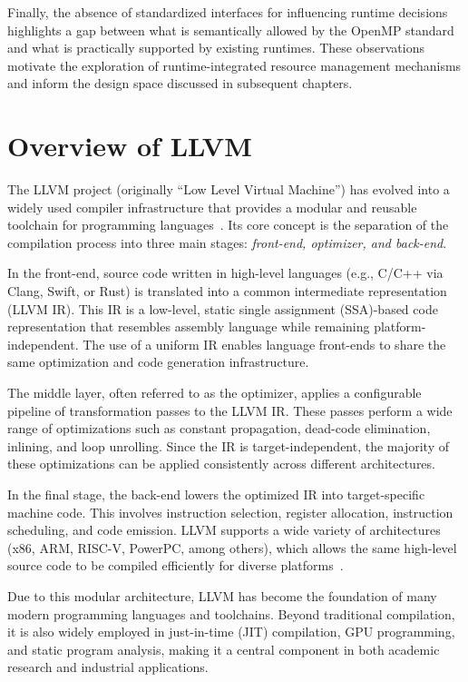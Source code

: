 Finally, the absence of standardized interfaces for influencing runtime decisions highlights a gap between what is semantically allowed by the OpenMP standard and what is practically supported by existing runtimes. These observations motivate the exploration of runtime-integrated resource management mechanisms and inform the design space discussed in subsequent chapters.

\section{Overview of LLVM}

The LLVM project (originally ``Low Level Virtual Machine'') has evolved into a widely used compiler infrastructure that provides a modular and reusable toolchain for programming languages~\parencite{lattner_llvm_2004}. Its core concept is the separation of the compilation process into three main stages: \textit{front-end, optimizer, and back-end}.

In the front-end, source code written in high-level languages (e.g., C/C++ via Clang, Swift, or Rust) is translated into a common intermediate representation (LLVM IR). This IR is a low-level, static single assignment (SSA)-based code representation that resembles assembly language while remaining platform-independent. The use of a uniform IR enables language front-ends to share the same optimization and code generation infrastructure.

The middle layer, often referred to as the optimizer, applies a configurable pipeline of transformation passes to the LLVM IR\@. These passes perform a wide range of optimizations such as constant propagation, dead-code elimination, inlining, and loop unrolling. Since the IR is target-independent, the majority of these optimizations can be applied consistently across different architectures.

In the final stage, the back-end lowers the optimized IR into target-specific machine code. This involves instruction selection, register allocation, instruction scheduling, and code emission. LLVM supports a wide variety of architectures (x86, ARM, RISC-V, PowerPC, among others), which allows the same high-level source code to be compiled efficiently for diverse platforms~\parencite{noauthor_llvm_nodate}.

Due to this modular architecture, LLVM has become the foundation of many modern programming languages and toolchains. Beyond traditional compilation, it is also widely employed in just-in-time (JIT) compilation, GPU programming, and static program analysis, making it a central component in both academic research and industrial applications.

